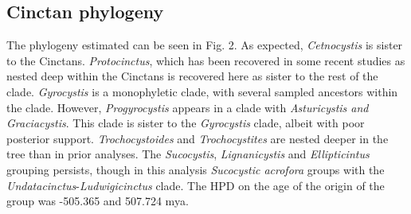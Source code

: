 \documentclass{article}
\begin{document}
\subsection{Cinctan phylogeny}

The phylogeny estimated can be seen in Fig. 2.
As expected, \textit{Cetnocystis} is sister to the Cinctans. 
\textit{Protocinctus}, which has been recovered in some recent studies as nested deep within the Cinctans is recovered here as sister to the rest of the clade. 
\textit{Gyrocystis} is a monophyletic clade, with several sampled ancestors within the clade. 
However, \textit{Progyrocystis} appears in a clade with \textit{Asturicystis and Graciacystis}. 
This clade is sister to the \textit{Gyrocystis} clade, albeit with poor posterior support. 
\textit{Trochocystoides} and \textit{Trochocystites} are nested deeper in the tree than in prior analyses.
The \textit{Sucocystis}, \textit{Lignanicystis} and \textit{Ellipticintus} grouping persists, though in this analysis \textit{Sucocystic acrofora} groups with the \textit{Undatacinctus}-\textit{Ludwigicinctus} clade.
The HPD on the age of the origin of the group was -505.365 and 507.724 mya.
\end{document}

